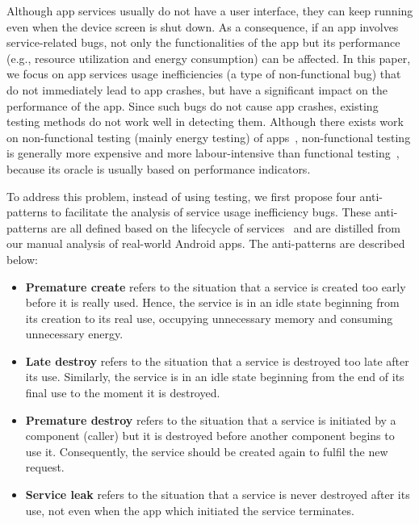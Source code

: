 \documentclass[sigconf,review, anonymous]{acmart}
\begin{document}
Although app services usually do not have a user interface, they can keep running
even when the device screen is shut down. As a consequence, if an app involves
service-related bugs, not only the functionalities of the app but its
performance (e.g., resource utilization and energy consumption) can be affected.
In this paper, we focus on app services usage inefficiencies (a type of non-functional bug) that do not immediately lead to app crashes, but
have a significant impact on the performance of the app.
Since such bugs do not cause app crashes, existing testing methods do
not work well in detecting them.
Although there exists work on non-functional testing (mainly energy testing) of
apps~\cite{LiuXC14,BanerjeeC0R14,LiuXCL14,BehrouzSBM16,JabbarvandM17},
non-functional testing is generally more expensive and more labour-intensive than functional
testing~\cite{BehrouzSBM16}, because its oracle is usually based on performance
indicators.


To address this problem, instead of using testing, we first propose four
anti-patterns to facilitate the analysis of service usage
inefficiency bugs. These anti-patterns are all defined based on the lifecycle
of services~\cite{Androidservice} and are distilled from our manual analysis
of real-world Android apps. The anti-patterns are described below:
\begin{itemize}
  \item {\bf Premature create} refers to the situation that a
service is created too early before it is really used. Hence, the service is in
an idle state beginning from its creation to its real use, occupying unnecessary
memory and consuming unnecessary energy.
\item  {\bf Late destroy} refers to the situation
that a service is destroyed too late after its use. Similarly, the service is in
an idle state beginning from the end of its final use to the moment it is destroyed.
\item {\bf Premature destroy} refers to the situation that a service is initiated by a
component (caller) but it is destroyed before another component begins to use
it. Consequently, the service should be created again to fulfil the new request.
\item {\bf Service leak} refers to the situation that a service is never destroyed
after its use, not even when the app which initiated the service terminates.
\end{itemize}
\end{document}
